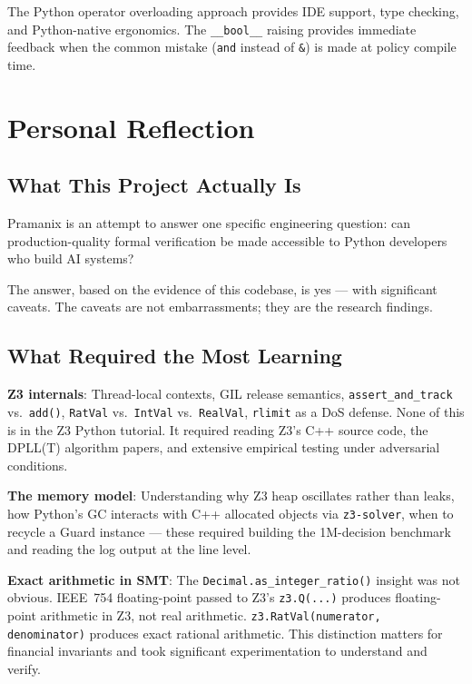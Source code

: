 \documentclass[12pt,a4paper,oneside]{report}
\newcommand{\code}[1]{\texttt{#1}}           %
\begin{document}
The Python operator overloading approach provides IDE support, type checking,
and Python-native ergonomics. The \code{\_\_bool\_\_} raising provides
immediate feedback when the common mistake (\code{and} instead of \code{\&})
is made at policy compile time.

\chapter{Personal Reflection}

\section{What This Project Actually Is}

Pramanix is an attempt to answer one specific engineering question: can
production-quality formal verification be made accessible to Python developers
who build AI systems?

The answer, based on the evidence of this codebase, is yes --- with significant
caveats. The caveats are not embarrassments; they are the research findings.

\section{What Required the Most Learning}

\textbf{Z3 internals}: Thread-local contexts, GIL release semantics,
\code{assert\_and\_track} vs.\ \code{add()}, \code{RatVal} vs.\ \code{IntVal}
vs.\ \code{RealVal}, \code{rlimit} as a DoS defense. None of this is in the
Z3 Python tutorial. It required reading Z3's C++ source code, the DPLL(T)
algorithm papers, and extensive empirical testing under adversarial conditions.

\textbf{The memory model}: Understanding why Z3 heap oscillates rather than
leaks, how Python's GC interacts with C++ allocated objects via
\code{z3-solver}, when to recycle a Guard instance --- these required building
the 1M-decision benchmark and reading the log output at the line level.

\textbf{Exact arithmetic in SMT}: The \code{Decimal.as\_integer\_ratio()}
insight was not obvious. IEEE~754 floating-point passed to Z3's \code{z3.Q(...)}
produces floating-point arithmetic in Z3, not real arithmetic.
\code{z3.RatVal(numerator, denominator)} produces exact rational arithmetic.
This distinction matters for financial invariants and took significant
experimentation to understand and verify.
\end{document}
